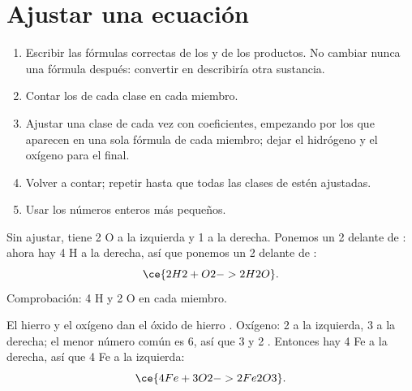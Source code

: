 \section{Ajustar una ecuación}

\begin{method}\label{met:g8:balanced-equations:balance}
\begin{enumerate}
  \item Escribir las fórmulas correctas de los  y de los
        productos. No cambiar nunca una fórmula después: convertir
         en  describiría otra sustancia.
  \item Contar los  de cada clase en cada miembro.
  \item Ajustar una clase de  cada vez con coeficientes, empezando
        por los  que aparecen en una sola fórmula de cada
        miembro; dejar el hidrógeno y el oxígeno para el final.
  \item Volver a contar; repetir hasta que todas las clases de 
        estén ajustadas.
  \item Usar los números enteros más pequeños.
\end{enumerate}
\end{method}

\begin{example}\label{ex:g8:balanced-equations:water}
Sin ajustar,  %
tiene 2 O a la izquierda y 1 a la derecha. Ponemos un 2 delante de
: ahora hay 4 H a la derecha, así que ponemos un 2 delante de
:
\[
  \ce{2H2 + O2 -> 2H2O}.
\]
Comprobación: 4 H y 2 O en cada miembro.
\end{example}

\begin{example}\label{ex:g8:balanced-equations:iron-oxide}
El hierro y el oxígeno dan el óxido de hierro . Oxígeno: 2 a
la izquierda, 3 a la derecha; el menor número común es 6, así que 3
 y 2 . Entonces hay 4 Fe a la derecha, así que 4 Fe a
la izquierda:
\[
  \ce{4Fe + 3O2 -> 2Fe2O3}.
\]
\end{example}

